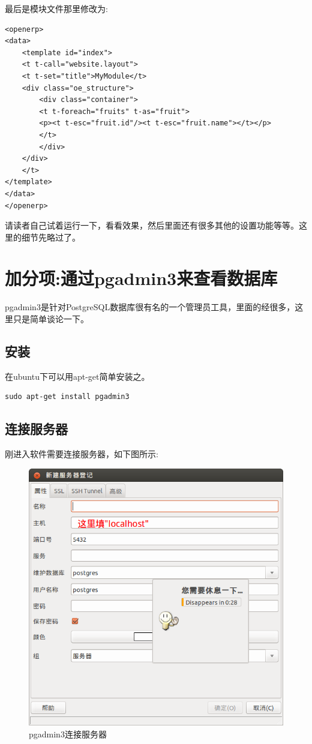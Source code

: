 \documentclass[11pt,a4paper]{sphinxmanual}
\begin{document}
最后是模块文件那里修改为:
\begin{Verbatim}
<openerp>
<data>
    <template id="index">
    <t t-call="website.layout">
    <t t-set="title">MyModule</t>
    <div class="oe_structure">
        <div class="container">
        <t t-foreach="fruits" t-as="fruit">
        <p><t t-esc="fruit.id"/><t t-esc="fruit.name"></t></p>
        </t>
        </div>
    </div>
    </t>
</template>
</data>
</openerp>
\end{Verbatim}

请读者自己试着运行一下，看看效果，然后里面还有很多其他的设置功能等等。这里的细节先略过了。


\section{加分项:通过pgadmin3来查看数据库}
\label{sec-5-4}
pgadmin3是针对PostgreSQL数据库很有名的一个管理员工具，里面的经很多，这里只是简单谈论一下。

\subsection{安装}
\label{sec-5-4-1}
在ubuntu下可以用apt-get简单安装之。
\begin{verbatim}
sudo apt-get install pgadmin3
\end{verbatim}

\subsection{连接服务器}
\label{sec-5-4-2}
刚进入软件需要连接服务器，如下图所示:

\begin{figure}[H]
\centering
\includegraphics[keepaspectratio,max width=0.95\linewidth]{images/pgadmin3连接服务器.png}
\caption{pgadmin3连接服务器}
\end{figure}
\end{document}
